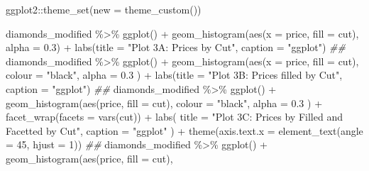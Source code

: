 \documentclass[
  letterpaper,
  DIV=11,
  numbers=noendperiod,
  oneside]{scrartcl}
\newenvironment{Shaded}{\begin{snugshade}}{\end{snugshade}}
\newcommand{\AttributeTok}[1]{\textcolor[rgb]{0.40,0.45,0.13}{#1}}
\newcommand{\DecValTok}[1]{\textcolor[rgb]{0.68,0.00,0.00}{#1}}
\newcommand{\DocumentationTok}[1]{\textcolor[rgb]{0.37,0.37,0.37}{\textit{#1}}}
\newcommand{\FloatTok}[1]{\textcolor[rgb]{0.68,0.00,0.00}{#1}}
\newcommand{\FunctionTok}[1]{\textcolor[rgb]{0.28,0.35,0.67}{#1}}
\newcommand{\NormalTok}[1]{\textcolor[rgb]{0.00,0.23,0.31}{#1}}
\newcommand{\SpecialCharTok}[1]{\textcolor[rgb]{0.37,0.37,0.37}{#1}}
\newcommand{\StringTok}[1]{\textcolor[rgb]{0.13,0.47,0.30}{#1}}
\begin{document}
\begin{Shaded}
\begin{Highlighting}[]
\NormalTok{ggplot2}\SpecialCharTok{::}\FunctionTok{theme\_set}\NormalTok{(}\AttributeTok{new =} \FunctionTok{theme\_custom}\NormalTok{())}

\NormalTok{diamonds\_modified }\SpecialCharTok{\%\textgreater{}\%} \FunctionTok{ggplot}\NormalTok{() }\SpecialCharTok{+}
  \FunctionTok{geom\_histogram}\NormalTok{(}\FunctionTok{aes}\NormalTok{(}\AttributeTok{x =}\NormalTok{ price, }\AttributeTok{fill =}\NormalTok{ cut), }\AttributeTok{alpha =} \FloatTok{0.3}\NormalTok{) }\SpecialCharTok{+}
  \FunctionTok{labs}\NormalTok{(}\AttributeTok{title =} \StringTok{"Plot 3A: Prices by Cut"}\NormalTok{, }\AttributeTok{caption =} \StringTok{"ggplot"}\NormalTok{)}
\DocumentationTok{\#\#}
\NormalTok{diamonds\_modified }\SpecialCharTok{\%\textgreater{}\%}
  \FunctionTok{ggplot}\NormalTok{() }\SpecialCharTok{+}
  \FunctionTok{geom\_histogram}\NormalTok{(}\FunctionTok{aes}\NormalTok{(}\AttributeTok{x =}\NormalTok{ price, }\AttributeTok{fill =}\NormalTok{ cut),}
    \AttributeTok{colour =} \StringTok{"black"}\NormalTok{, }\AttributeTok{alpha =} \FloatTok{0.3}
\NormalTok{  ) }\SpecialCharTok{+}
  \FunctionTok{labs}\NormalTok{(}\AttributeTok{title =} \StringTok{"Plot 3B: Prices filled by Cut"}\NormalTok{, }\AttributeTok{caption =} \StringTok{"ggplot"}\NormalTok{)}
\DocumentationTok{\#\#}
\NormalTok{diamonds\_modified }\SpecialCharTok{\%\textgreater{}\%} \FunctionTok{ggplot}\NormalTok{() }\SpecialCharTok{+}
  \FunctionTok{geom\_histogram}\NormalTok{(}\FunctionTok{aes}\NormalTok{(price, }\AttributeTok{fill =}\NormalTok{ cut),}
    \AttributeTok{colour =} \StringTok{"black"}\NormalTok{, }\AttributeTok{alpha =} \FloatTok{0.3}
\NormalTok{  ) }\SpecialCharTok{+}
  \FunctionTok{facet\_wrap}\NormalTok{(}\AttributeTok{facets =} \FunctionTok{vars}\NormalTok{(cut)) }\SpecialCharTok{+}
  \FunctionTok{labs}\NormalTok{(}
    \AttributeTok{title =} \StringTok{"Plot 3C: Prices by Filled and Facetted by Cut"}\NormalTok{,}
    \AttributeTok{caption =} \StringTok{"ggplot"}
\NormalTok{  ) }\SpecialCharTok{+}
  \FunctionTok{theme}\NormalTok{(}\AttributeTok{axis.text.x =} \FunctionTok{element\_text}\NormalTok{(}\AttributeTok{angle =} \DecValTok{45}\NormalTok{, }\AttributeTok{hjust =} \DecValTok{1}\NormalTok{))}
\DocumentationTok{\#\#}
\NormalTok{diamonds\_modified }\SpecialCharTok{\%\textgreater{}\%} \FunctionTok{ggplot}\NormalTok{() }\SpecialCharTok{+}
  \FunctionTok{geom\_histogram}\NormalTok{(}\FunctionTok{aes}\NormalTok{(price, }\AttributeTok{fill =}\NormalTok{ cut),}

\end{Highlighting}
\end{Shaded}
\end{document}
